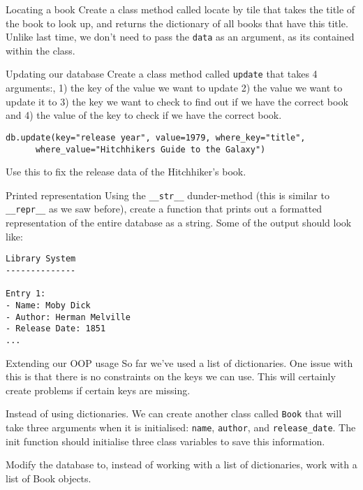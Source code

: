 \documentclass[10pt]{beamer}
\begin{document}
\begin{frame}[label={sec:org21bf358},fragile]{Locating a book}
 Create a class method called locate by tile that takes the title of the book to look
up, and returns the dictionary of all books that have this title. Unlike last time,
we don't need to pass the \texttt{data} as an argument, as its contained within the class.
\end{frame}

\begin{frame}[label={sec:org2449981},fragile]{Updating our database}
 Create a class method called \texttt{update} that takes 4 arguments:, 1) the key of the value
we want to update 2) the value we want to update it to 3) the key we want to check
to find out if we have the correct book and 4) the value of the key to check if we
have the correct book.

\begin{verbatim}
db.update(key="release year", value=1979, where_key="title",
	  where_value="Hitchhikers Guide to the Galaxy")
\end{verbatim}

Use this to fix the release data of the Hitchhiker's book.
\end{frame}

\begin{frame}[label={sec:org01ac451},fragile]{Printed representation}
 Using the \texttt{\_\_str\_\_} dunder-method (this is similar to \texttt{\_\_repr\_\_} as we saw before),
create a function that prints out a formatted representation of the entire database
as a string. Some of the output should look like:

\begin{verbatim}
Library System
--------------

Entry 1:
- Name: Moby Dick
- Author: Herman Melville
- Release Date: 1851
...
\end{verbatim}
\end{frame}

\begin{frame}[label={sec:org69ca952},fragile]{Extending our OOP usage}
 So far we've used a list of dictionaries. One issue with this is that there is no
constraints on the keys we can use. This will certainly create problems if certain
keys are missing.

Instead of using dictionaries. We can create another class called \texttt{Book} that will take
three arguments when it is initialised: \texttt{name}, \texttt{author}, and \texttt{release\_date}. The init
function should initialise three class variables to save this information.

Modify the database to, instead of working with a list of dictionaries, work with a
list of Book objects.
\end{frame}
\end{document}
